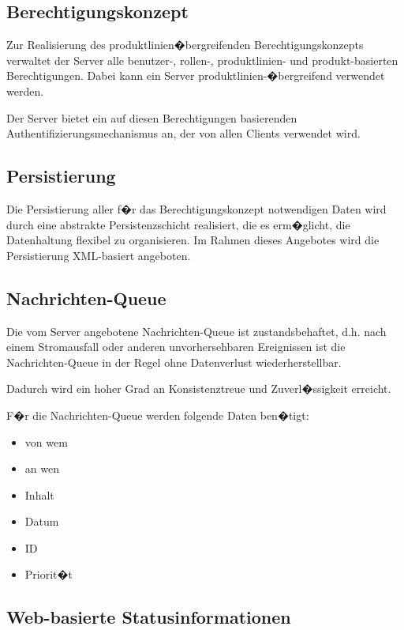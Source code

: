 \subsection{Berechtigungskonzept}

Zur Realisierung des produktlinien\-�bergreifenden Berechtigungskonzepts
verwaltet der Server alle benutzer-, rollen-, produktlinien- und
produkt-basierten Berechtigungen. Dabei kann ein Server produktlinien-�bergreifend
verwendet werden.\par
Der Server bietet ein auf diesen Berechtigungen basierenden
Authentifizierungsmechanismus an, der von allen Clients verwendet wird.

\subsection{Persistierung}

Die Persistierung aller f�r das Berechtigungskonzept notwendigen Daten wird
durch eine abstrakte Persistenzschicht realisiert, die es erm�glicht, die
Datenhaltung flexibel zu organisieren. Im Rahmen dieses Angebotes wird die
Persistierung XML-basiert angeboten.

\subsection{Nachrichten-Queue}

Die vom Server angebotene Nachrichten-Queue ist zustandsbehaftet, d.h. nach einem
Stromausfall oder anderen unvorhersehbaren Ereignissen ist die Nachrichten-Queue
in der Regel ohne Datenverlust wiederherstellbar.\par
Dadurch wird ein hoher Grad an Konsistenztreue und Zuverl�ssigkeit erreicht.\newline

F�r die Nachrichten-Queue werden folgende Daten ben�tigt:
\begin{itemize}
\item von wem
\item an wen
\item Inhalt
\item Datum
\item ID
\item Priorit�t
\end{itemize}



\subsection{Web-basierte Statusinformationen}

